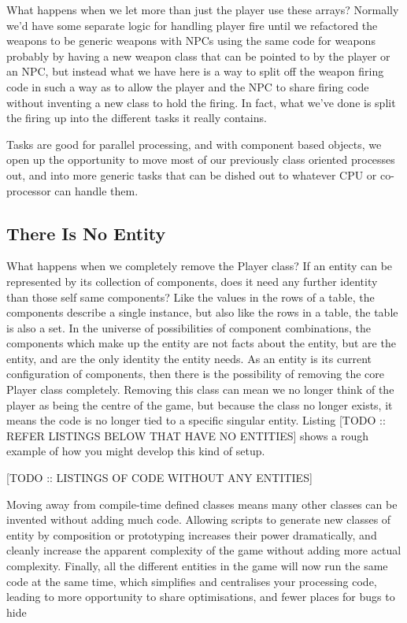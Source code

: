 \documentclass[a4paper,12pt]{article}
\begin{document}
What happens when we let more than just the player use these arrays?
Normally we'd have some separate logic for handling player fire until we refactored the weapons to be generic weapons with NPCs using the same code for weapons probably by having a new weapon class that can be pointed to by the player or an NPC, but instead what we have here is a way to split off the weapon firing code in such a way as to allow the player and the NPC to share firing code without inventing a new class to hold the firing.
In fact, what we've done is split the firing up into the different tasks it really contains.

Tasks are good for parallel processing, and with component based objects, we open up the opportunity to move most of our previously class oriented processes out, and into more generic tasks that can be dished out to whatever CPU or co-processor can handle them.

\subsection{There Is No Entity}

What happens when we completely remove the Player class?
If an entity can be represented by its collection of components, does it need any further identity than those self same components?
Like the values in the rows of a table, the components describe a single instance, but also like the rows in a table, the table is also a set.
In the universe of possibilities of component combinations, the components which make up the entity are not facts about the entity, but are the entity, and are the only identity the entity needs.
As an entity is its current configuration of components, then there is the possibility of removing the core Player class completely.
Removing this class can mean we no longer think of the player as being the centre of the game, but because the class no longer exists, it means the code is no longer tied to a specific singular entity.
Listing [TODO :: REFER LISTINGS BELOW THAT HAVE NO ENTITIES] shows a rough example of how you might develop this kind of setup.

[TODO :: LISTINGS OF CODE WITHOUT ANY ENTITIES]

Moving away from compile-time defined classes means many other classes can be invented without adding much code.
Allowing scripts to generate new classes of entity by composition or prototyping increases their power dramatically, and cleanly increase the apparent complexity of the game without adding more actual complexity.
Finally, all the different entities in the game will now run the same code at the same time, which simplifies and centralises your processing code, leading to more opportunity to share optimisations, and fewer places for bugs to hide
\end{document}
